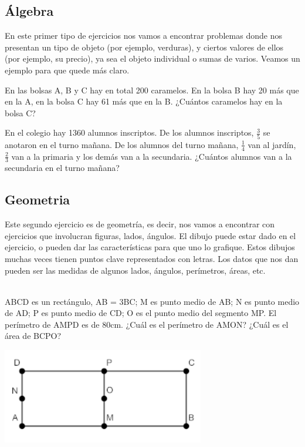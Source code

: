 \documentclass{article}
\begin{document}
\subsection{Álgebra}
\begin{small}
En este primer tipo de ejercicios nos vamos a encontrar problemas donde nos presentan un tipo de objeto (por ejemplo, verduras), y ciertos valores de ellos (por ejemplo, su precio), ya sea el objeto individual o sumas de varios. Veamos un ejemplo para que quede más claro.
\\
\end{small}

\begin{ejemplo}
En las bolsas A, B y C hay en total 200 caramelos. En la bolsa B hay 20 más que
en la A, en la bolsa C hay 61 más que en la B. ¿Cuántos caramelos hay en la bolsa C?
\end{ejemplo}

\begin{ejemplo}
En el colegio hay 1360 alumnos inscriptos. De los alumnos inscriptos, $\frac{3}{5}$ se anotaron en el turno mañana. De los alumnos del turno mañana, $\frac{1}{4}$ van al jardín, $\frac{2}{3}$ van a la primaria y los demás van a la secundaria. ¿Cuántos alumnos van a la secundaria en el turno mañana?
\end{ejemplo}

\subsection{Geometria}
\begin{small}
Este segundo ejercicio es de geometría, es decir, nos vamos a encontrar con ejercicios que involucran figuras, lados, ángulos.
El dibujo puede estar dado en el ejercicio, o pueden dar las características para que uno lo grafique. Estos dibujos muchas veces tienen puntos clave representados con letras.
Los datos que nos dan pueden ser las medidas de algunos lados, ángulos, perímetros, áreas, etc.
\\ \\
\end{small}

\begin{ejemplo}
ABCD es un rectángulo,
AB = 3BC;
M es punto medio de AB;
N es punto medio de AD;
P es punto medio de CD;
O es el punto medio del segmento MP.
El perímetro de AMPD es de 80cm.
¿Cuál es el perímetro de AMON?
¿Cuál es el área de BCPO?

\includegraphics[scale=0.6]{geometry-example-1}
\\
\\
\end{ejemplo}
\end{document}
